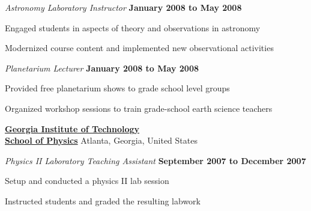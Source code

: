 \documentclass[10pt]{article}
\newenvironment{outerlist}[1][\enskip\textbullet]%
        {\begin{enumerate}[#1]}{\end{enumerate}%
         \vspace{-.6\baselineskip}}
\newenvironment{innerlist}[1][\enskip\textbullet]%
        {\begin{compactenum}[#1]}{\end{compactenum}}
\begin{document}
\begin{outerlist}
\item[] \textit{Astronomy Laboratory Instructor}%
        \hfill \textbf{January 2008 to May 2008}
\begin{innerlist}
  \item Engaged students in aspects of theory and observations in astronomy
  \item Modernized course content and implemented new observational activities
\end{innerlist}

\end{outerlist}

\begin{outerlist}
\item[] \textit{Planetarium Lecturer}%
        \hfill \textbf{January 2008 to May 2008}
\begin{innerlist}
  \item Provided free planetarium shows to grade school level groups
  \item Organized workshop sessions to train grade-school earth science teachers
  \\
\end{innerlist}

\end{outerlist}

\href{http://www.physics.gatech.edu/}{\textbf{Georgia Institute of Technology}}\\
\href{http://www.physics.gatech.edu/}{\textbf{School of Physics}}
\hfill Atlanta, Georgia, United States
\begin{outerlist}
\item[] \textit{Physics II Laboratory Teaching Assistant}%
        \hfill \textbf{September 2007 to December 2007}
\begin{innerlist}
  \item Setup and conducted a physics II lab session
  \item Instructed students and graded the resulting labwork
  \\
\end{innerlist}

\end{outerlist}
\end{document}
